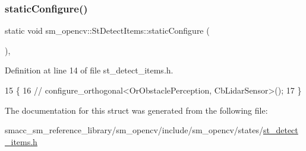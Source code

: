 \subsubsection{\texorpdfstring{static\+Configure()}{staticConfigure()}}
{\footnotesize\ttfamily static void sm\+\_\+opencv\+::\+St\+Detect\+Items\+::static\+Configure (\begin{DoxyParamCaption}{ }\end{DoxyParamCaption})\hspace{0.3cm}{\ttfamily [inline]}, {\ttfamily [static]}}



Definition at line 14 of file st\+\_\+detect\+\_\+items.\+h.


\begin{DoxyCode}
15   \{
16     \textcolor{comment}{//   configure\_orthogonal<OrObstaclePerception, CbLidarSensor>();}
17   \}
\end{DoxyCode}


The documentation for this struct was generated from the following file\+:\begin{DoxyCompactItemize}
\item 
smacc\+\_\+sm\+\_\+reference\+\_\+library/sm\+\_\+opencv/include/sm\+\_\+opencv/states/\hyperlink{st__detect__items_8h}{st\+\_\+detect\+\_\+items.\+h}\end{DoxyCompactItemize}
